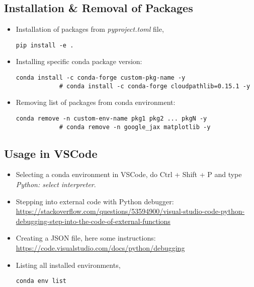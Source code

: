 \documentclass[12pt, a4paper]{article}
\numberwithin{equation}{section}
\theoremstyle{definition}
\theoremstyle{definition}
\begin{document}
	\subsection{Installation \& Removal of Packages}
	
	\begin{itemize} 
	
		\item Installation of packages from \textit{pyproject.toml} file, 
		
		\begin{lstlisting}[style=mystylebash, label=alg:pyproject_install, xleftmargin=\parindent]
			pip install -e . 
		\end{lstlisting}
	
		\item Installing specific conda package version:
		
		\begin{lstlisting}[style=mystylebash, label=alg:conda__spec_env_version, xleftmargin=\parindent]
			conda install -c conda-forge custom-pkg-name -y
			# conda install -c conda-forge cloudpathlib=0.15.1 -y
		\end{lstlisting}
	
		\item Removing list of packages from conda environment: 
		
		\begin{lstlisting}[style=mystylebash, label=alg:conda__remove_pkgs, xleftmargin=\parindent]
			conda remove -n custom-env-name pkg1 pkg2 ... pkgN -y
			# conda remove -n google_jax matplotlib -y
		\end{lstlisting}
		
	\end{itemize}

	\subsection{Usage in VSCode}

	\begin{itemize}
		\item Selecting a conda environment in VSCode, do Ctrl + Shift + P and type \textit{Python: select interpreter}. 
		
		\item Stepping into external code with Python debugger:  \url{https://stackoverflow.com/questions/53594900/visual-studio-code-python-debugging-step-into-the-code-of-external-functions}
		
		
		\item Creating a JSON file, here some instructions: \url{https://code.visualstudio.com/docs/python/debugging}
		
		\item Listing all installed environments, 
		
		\begin{lstlisting}[style=mystylebash, label=alg:conda_env_list, xleftmargin=\parindent]
			conda env list
		\end{lstlisting}
		
	\end{itemize}
\end{document}
